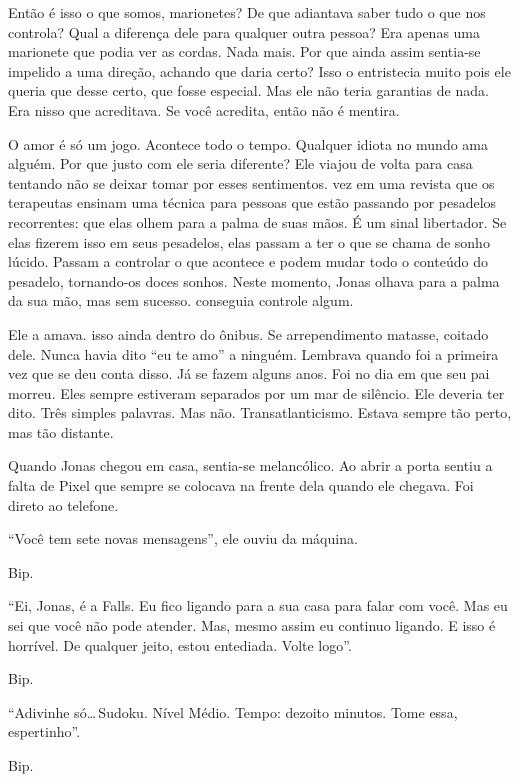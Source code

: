 Então é isso o que somos, marionetes? De que adiantava saber tudo o que nos controla? Qual a diferença dele para qualquer outra pessoa? Era apenas uma marionete que podia ver as cordas. Nada mais. Por que ainda assim sentia-se impelido a uma direção, achando que daria certo? Isso o entristecia muito\mudanca{,} pois ele queria que desse certo, que fosse especial. Mas ele não teria garantias de nada. Era nisso que acreditava. Se você acredita, então não é mentira.

O amor é só um jogo. Acontece todo o tempo. Qualquer idiota no mundo ama alguém. Por que justo com ele seria diferente? Ele viajou de volta para casa tentando não se deixar tomar por esses sentimentos.  vez  em uma revista que os terapeutas ensinam uma técnica para pessoas que estão passando por pesadelos recorrentes: que elas olhem para a palma de suas mãos. É um sinal libertador. Se elas fizerem isso em seus pesadelos, elas passam a ter o que se chama de sonho lúcido. Passam a controlar o que acontece e podem mudar todo o conteúdo do pesadelo, tornando-os doces sonhos. Neste momento, Jonas olhava para a palma da sua mão, mas sem sucesso.  conseguia controle algum.

Ele a amava.  isso ainda dentro do ônibus. Se arrependimento matasse, coitado dele. Nunca havia dito ``eu te amo'' a ninguém. Lembrava quando foi a primeira vez que se deu conta disso. Já se fazem alguns anos. Foi no dia em que seu pai morreu. Eles sempre estiveram separados por um mar de silêncio. Ele deveria ter dito. Três simples palavras. Mas não. Transatlanticismo. Estava sempre tão perto, mas tão distante.

Quando Jonas chegou em casa, sentia-se melancólico. Ao abrir a porta sentiu a falta de Pixel\mudanca{,} que sempre se colocava na frente dela quando ele chegava. Foi direto ao telefone.

``Você tem sete novas mensagens'', ele ouviu da máquina.

Bip.

``Ei, Jonas, é a Falls. Eu fico ligando para a sua casa para falar com você. Mas eu sei que você não pode atender. Mas, mesmo assim eu continuo ligando. E isso é horrível. De qualquer jeito, estou entediada. Volte logo''.

Bip.

``Adivinhe só\ldots\,Sudoku. Nível Médio. Tempo: dezoito minutos. Tome essa, espertinho''.

Bip.

